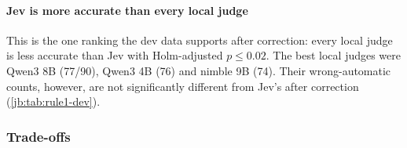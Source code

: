\documentclass[11pt,letterpaper]{article}
\newcommand{\DevN}{90}
\newcommand{\MaxLocalAccPHolmDev}{0.02}
\newcommand{\NimbleDevAccK}{74}
\newcommand{\QwenEightDevAccK}{77}
\newcommand{\QwenFourDevAccK}{76}
\begin{document}
\paragraph{Jev is more accurate than every local judge} This is the one ranking the dev data supports
after correction: every local judge is less accurate than Jev with Holm-adjusted $p \le
\MaxLocalAccPHolmDev$. The best local judges were Qwen3 8B (\QwenEightDevAccK/\DevN), Qwen3 4B
(\QwenFourDevAccK) and nimble 9B (\NimbleDevAccK). Their wrong-automatic counts, however, are not
significantly different from Jev's after correction (\cref{jb:tab:rule1-dev}).

\subsubsection{Trade-offs}
\end{document}
